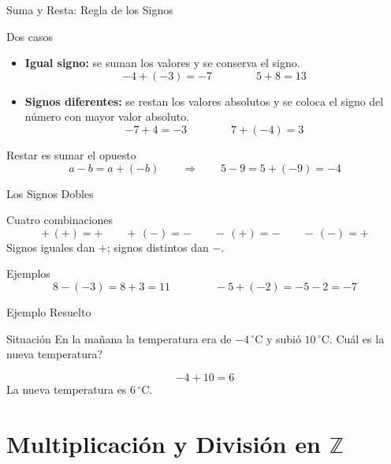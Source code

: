 \documentclass[aspectratio=169]{beamer}
\newcommand{\Z}{\mathbb{Z}}
\begin{document}
\begin{frame}{Suma y Resta: Regla de los Signos}
  \begin{block}{Dos casos}
    \begin{itemize}
      \item \textbf{Igual signo:} se suman los valores y se conserva el signo.
            \[
              -4 + (-3) = -7 \qquad\qquad 5 + 8 = 13
            \]
      \item \textbf{Signos diferentes:} se restan los valores absolutos y se coloca el signo del número con mayor valor absoluto.
            \[
              -7 + 4 = -3 \qquad\qquad 7 + (-4) = 3
            \]
    \end{itemize}
  \end{block}
  \vspace{4pt}
  \begin{exampleblock}{Restar es sumar el opuesto}
    \[
      a - b = a + (-b) \qquad\Longrightarrow\qquad 5 - 9 = 5 + (-9) = -4
    \]
  \end{exampleblock}
\end{frame}

\begin{frame}{Los Signos Dobles}
  \begin{alertblock}{Cuatro combinaciones}
    \[
      +\,(+)=+ \qquad +\,(-)=- \qquad -\,(+)=- \qquad -\,(-)=+
    \]
    Signos iguales dan $+$; signos distintos dan $-$.
  \end{alertblock}
  \vspace{6pt}
  \begin{block}{Ejemplos}
    \[
      8 - (-3) = 8 + 3 = 11 \qquad\qquad -5 + (-2) = -5 - 2 = -7
    \]
  \end{block}
\end{frame}

\begin{frame}{Ejemplo Resuelto}
  \begin{block}{Situación}
    En la mañana la temperatura era de $-4\,^{\circ}$C y subió $10\,^{\circ}$C. \textquestiondown Cuál es la nueva temperatura?
  \end{block}
  \vspace{6pt}
  \begin{mwextra}[Solución]
    \[
      -4 + 10 = 6
    \]
    La nueva temperatura es $6\,^{\circ}$C.
  \end{mwextra}
\end{frame}

\section{Multiplicación y División en $\Z$}
\end{document}
